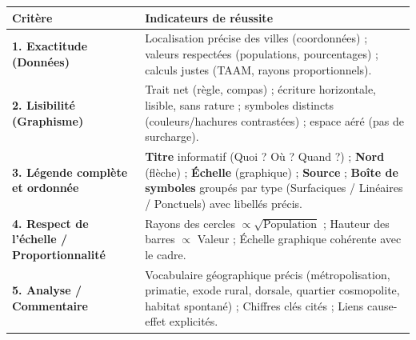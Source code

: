 \documentclass[11pt]{article}
\begin{document}
\begin{aretenir}
\begin{tabularx}{\linewidth}{|l|X|}\hline
\textbf{Critère} & \textbf{Indicateurs de réussite} \\ \hline
\textbf{1. Exactitude (Données)} & Localisation précise des villes (coordonnées) ; valeurs respectées (populations, pourcentages) ; calculs justes (TAAM, rayons proportionnels). \\ \hline
\textbf{2. Lisibilité (Graphisme)} & Trait net (règle, compas) ; écriture horizontale, lisible, sans rature ; symboles distincts (couleurs/hachures contrastées) ; espace aéré (pas de surcharge). \\ \hline
\textbf{3. Légende complète et ordonnée} & \textbf{Titre} informatif (Quoi ? Où ? Quand ?) ; \textbf{Nord} (flèche) ; \textbf{Échelle} (graphique) ; \textbf{Source} ; \textbf{Boîte de symboles} groupés par type (Surfaciques / Linéaires / Ponctuels) avec libellés précis. \\ \hline
\textbf{4. Respect de l'échelle / Proportionnalité} & Rayons des cercles $\propto \sqrt{\text{Population}}$ ; Hauteur des barres $\propto$ Valeur ; Échelle graphique cohérente avec le cadre. \\ \hline
\textbf{5. Analyse / Commentaire} & Vocabulaire géographique précis (métropolisation, primatie, exode rural, dorsale, quartier cosmopolite, habitat spontané) ; Chiffres clés cités ; Liens cause-effet explicités. \\ \hline
\end{tabularx}
\end{aretenir}
\end{document}
